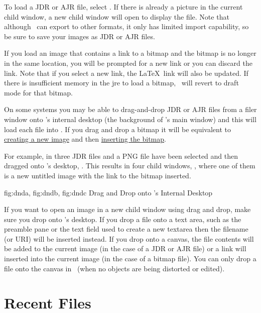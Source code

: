 
To load a \gls{JDR} or \gls{AJR} file, select .
If there is already a picture in the current child window, a new
child window will open to display the file. Note that although
\FlowframTk\ can export to other formats, it only has limited
import capability, so be sure to save your images as 
\gls{JDR} or \gls{AJR} files.

If you load an image that contains a link to a \gls{bitmap} and
the bitmap is no longer in the same location, you will be prompted
for a new link or you can discard the link. Note that if you
select a new link, the \LaTeX\ link will also be updated.
If there is insufficient memory in the \gls{jre} to load a bitmap,
\FlowframTk\ will revert to draft mode for that bitmap.

On some systems you may be able to \gls{drag-and-drop} \gls*{JDR} or
\gls*{AJR} files from a filer window onto \FlowframTk's internal desktop
(the  background of \FlowframTk's main window) and this
will load each file into \FlowframTk. If you drag and drop a
\gls{bitmap} it will be equivalent to \hyperref[sec:newimage]{creating a
new image} and then \hyperref[sec:insertbitmap]{inserting the bitmap}.

For example, in  three \gls{JDR} files and
a PNG file have been selected and then dragged onto \FlowframTk's
desktop, . This results in four child
windows, , where one of them is a new
untitled image with the link to the \gls{bitmap} inserted.

{
  {fig:dnda}{}{},
  {fig:dndb}{}{},
  {fig:dndc}{}{}
}
{Drag and Drop onto \FlowframTk's Internal Desktop}

If you want to open an image in a new child window using drag and drop,
make sure you drop onto \FlowframTk's desktop. If you drop a file onto a
text area, such as the preamble pane or the text field used to
create a new \gls{textarea} then the filename (or URI) will be
inserted instead. If you drop onto a \gls{canvas}, the file contents
will be added to the current image (in the case of a \gls{JDR} or
\gls{AJR} file) or a link will inserted into the current image (in the
case of a \gls{bitmap} file). You can only drop a file onto the
\gls{canvas} in \selectmode\ (when no objects are being distorted or
edited).

\section{Recent Files}\label{sec:recentfiles}

